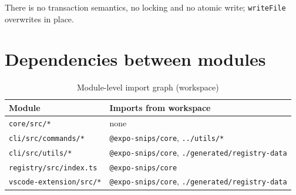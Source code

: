 There is no transaction semantics, no locking and no atomic write;
\texttt{writeFile} overwrites in place.

\section{Dependencies between modules}

\begin{table}[H]
\centering
\caption{Module-level import graph (workspace)}
\begin{tabular}{p{5.4cm}p{8.2cm}}
\toprule
\textbf{Module} & \textbf{Imports from workspace} \\
\midrule
\texttt{core/src/*} & none \\
\texttt{cli/src/commands/*} & \texttt{@expo-snips/core}, \texttt{../utils/*} \\
\texttt{cli/src/utils/*} & \texttt{@expo-snips/core}, \texttt{./generated/registry-data} \\
\texttt{registry/src/index.ts} & \texttt{@expo-snips/core} \\
\texttt{vscode-extension/src/*} & \texttt{@expo-snips/core}, \texttt{./generated/registry-data} \\
\bottomrule
\end{tabular}
\end{table}
